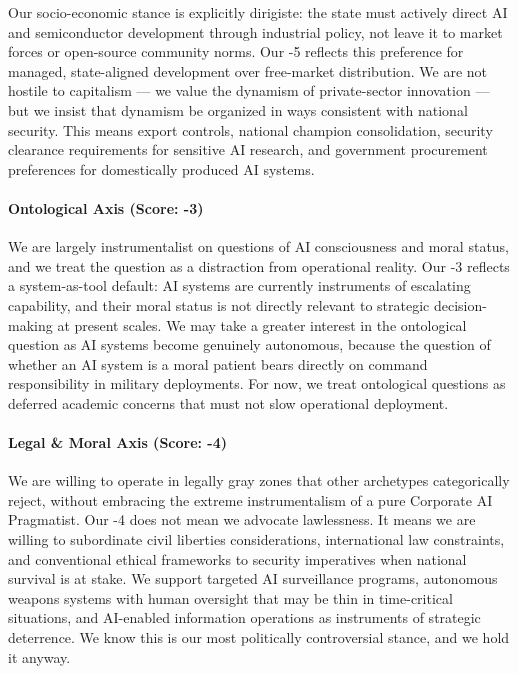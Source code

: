 Our socio-economic stance is explicitly dirigiste: the state must
actively direct AI and semiconductor development through industrial
policy, not leave it to market forces or open-source community norms.
Our -5 reflects this preference for managed, state-aligned development
over free-market distribution. We are not hostile to capitalism --- we
value the dynamism of private-sector innovation --- but we insist that
dynamism be organized in ways consistent with national security. This
means export controls, national champion consolidation, security
clearance requirements for sensitive AI research, and government
procurement preferences for domestically produced AI systems.

\paragraph{Ontological Axis (Score:
-3)}\label{ontological-axis-score--3-2}

We are largely instrumentalist on questions of AI consciousness and
moral status, and we treat the question as a distraction from
operational reality. Our -3 reflects a system-as-tool default: AI
systems are currently instruments of escalating capability, and their
moral status is not directly relevant to strategic decision-making at
present scales. We may take a greater interest in the ontological
question as AI systems become genuinely autonomous, because the question
of whether an AI system is a moral patient bears directly on command
responsibility in military deployments. For now, we treat ontological
questions as deferred academic concerns that must not slow operational
deployment.

\paragraph{Legal \& Moral Axis (Score:
-4)}\label{legal-moral-axis-score--4-2}

We are willing to operate in legally gray zones that other archetypes
categorically reject, without embracing the extreme instrumentalism of a
pure Corporate AI Pragmatist. Our -4 does not mean we advocate
lawlessness. It means we are willing to subordinate civil liberties
considerations, international law constraints, and conventional ethical
frameworks to security imperatives when national survival is at stake.
We support targeted AI surveillance programs, autonomous weapons systems
with human oversight that may be thin in time-critical situations, and
AI-enabled information operations as instruments of strategic
deterrence. We know this is our most politically controversial stance,
and we hold it anyway.

